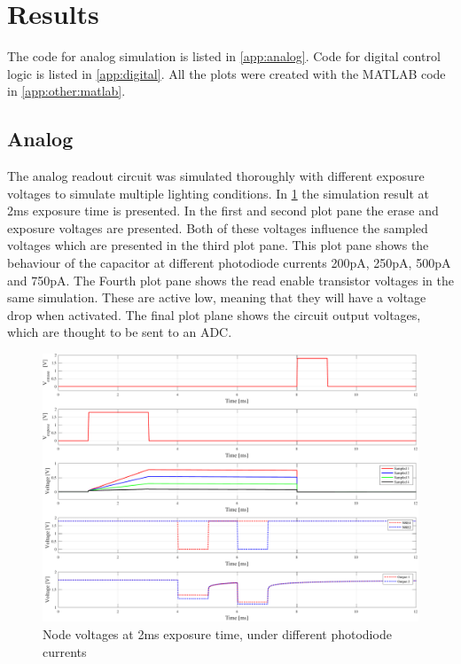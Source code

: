 \section{Results}

The code for analog simulation is listed in \cref{app:analog}. 
Code for digital control logic is listed in \cref{app:digital}. 
All the plots were created with the MATLAB code in \cref{app:other:matlab}.

\subsection{Analog}
\label{Analog_res}
The analog readout circuit was simulated thoroughly with different exposure voltages to simulate multiple lighting conditions. 
In \cref{fig:res:anal:all@2ms} the simulation result at 2ms exposure time is presented. 
In the first and second plot pane the erase and exposure voltages are presented. 
Both of these voltages influence the sampled voltages which are presented in the third plot pane. 
This plot pane shows the behaviour of the capacitor at different photodiode currents 200pA, 250pA, 500pA and 750pA.
The Fourth plot pane shows the read enable transistor voltages in the same simulation. 
These are active low, meaning that they will have a voltage drop when activated. 
The final plot plane shows the circuit output voltages, which are thought to be sent to an ADC.

\begin{figure}[!htbp]
    \centering
    \includegraphics[width=\textwidth]{Images/Analog_plots/all_in_1.pdf}
    \caption{Node voltages at 2ms exposure time, under different photodiode currents}
    \label{fig:res:anal:all@2ms}
\end{figure}

